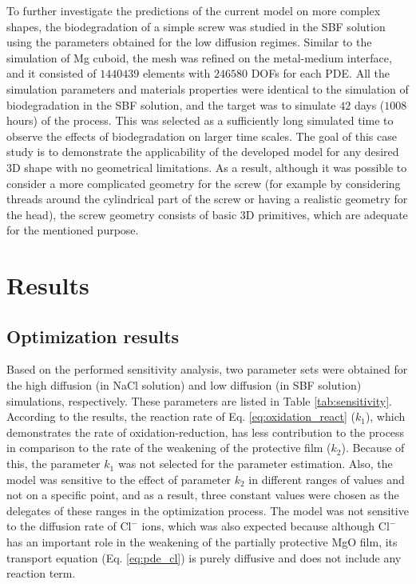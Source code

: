 To further investigate the predictions of the current model on more complex shapes, the biodegradation of a simple screw was studied in the \gls{SBF} solution using the parameters obtained for the low diffusion regimes. Similar to the simulation of Mg cuboid, the mesh was refined on the metal-medium interface, and it consisted of $\num{1440439}$ elements with $\num{246580}$ DOFs for each \gls{PDE}. All the simulation parameters and materials properties were identical to the simulation of biodegradation in the \gls{SBF} solution, and the target was to simulate $42$ days ($1008$ hours) of the process. This was selected as a sufficiently long simulated time to observe the effects of biodegradation on larger time scales. The goal of this case study is to demonstrate the applicability of the developed model for any desired 3D shape with no geometrical limitations. As a result, although it was possible to consider a more complicated geometry for the screw (for example by considering threads around the cylindrical part of the screw or having a realistic geometry for the head), the screw geometry consists of basic 3D primitives, which are adequate for the mentioned purpose.

\section{Results}

\subsection{Optimization results}

Based on the performed sensitivity analysis, two parameter sets were obtained for the high diffusion (in NaCl solution) and low diffusion (in \gls{SBF} solution) simulations, respectively. These parameters are listed in Table \ref{tab:sensitivity}. According to the results, the reaction rate of  Eq. \ref{eq:oxidation_react} ($k_1$), which demonstrates the rate of oxidation-reduction, has less contribution to the process in comparison to the rate of the weakening of the protective film ($k_2$). Because of this, the parameter $k_1$ was not selected for the parameter estimation. Also, the model was sensitive to the effect of parameter $k_2$ in different ranges of values and not on a specific point, and as a result, three constant values were chosen as the delegates of these ranges in the optimization process. The model was not sensitive to the diffusion rate of $\mathrm{Cl}^{-}$ ions, which was also expected because although $\mathrm{Cl}^{-}$ has an important role in the weakening of the partially protective MgO film, its transport equation (Eq. \ref{eq:pde_cl}) is purely diffusive and does not include any reaction term.


